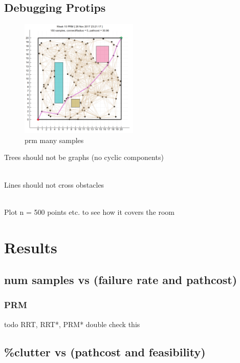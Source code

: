 \documentclass[a4paper]{article}
\begin{document}
    \subsection{Debugging Protips}

 
 
\begin{figure} \centering
    \includegraphics[width=0.5\textwidth]{./PRM_manysamples.png}
     \caption{prm many samples}
 \end{figure}


    Trees should not be graphs (no cyclic components)

    \\

    Lines should not cross obstacles

    \\

    Plot n = 500 points etc. to see how it covers the room


\section{Results}

    \subsection{num samples vs (failure rate and pathcost)}
    \subsubsection{PRM}

    todo RRT, RRT*, PRM* double check this

    \subsection{\%clutter vs (pathcost and feasibility)}
\end{document}
